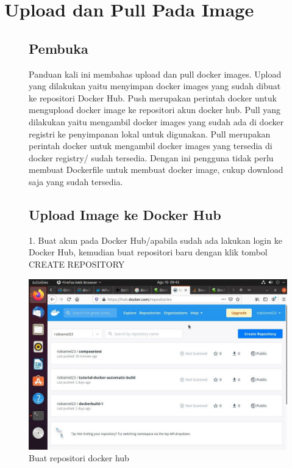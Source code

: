 \chapter{Upload dan Pull Pada Image}

\begin{figure}
\section{Pembuka}
Panduan kali ini membahas upload dan pull docker images. Upload yang dilakukan yaitu menyimpan docker images yang sudah dibuat ke repositori Docker Hub.
Push merupakan perintah docker untuk mengupload docker image ke repositori akun docker hub. 
Pull yang dilakukan yaitu mengambil docker images yang sudah ada di docker registri ke penyimpanan lokal untuk digunakan. 
Pull merupakan perintah docker untuk mengambil docker images yang tersedia di docker registry/ sudah tersedia. Dengan ini pengguna tidak perlu membuat Dockerfile untuk membuat docker image, cukup download saja yang sudah tersedia.

    \section{Upload Image ke Docker Hub}

    1. Buat akun pada Docker Hub/apabila sudah ada lakukan login ke Docker Hub, kemudian buat repositori baru dengan klik tombol CREATE REPOSITORY
        \begin{center}
            \includegraphics[width=\linewidth]{image/26.jpg}
            \caption{Buat repositori docker hub}
            \label{fig:my_figure}
        \end{center}

\end{figure}
